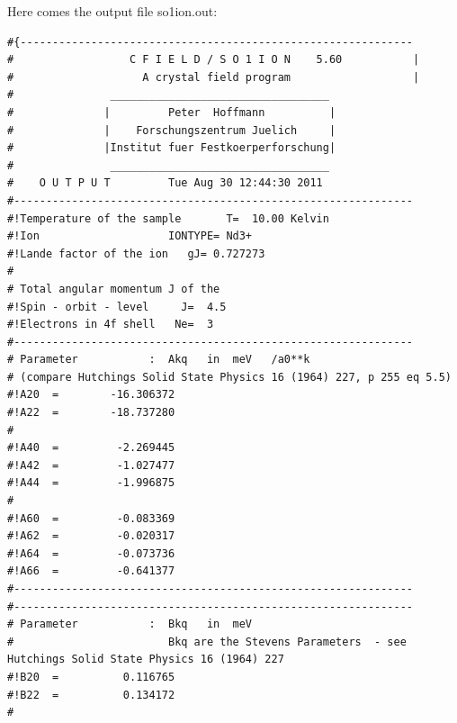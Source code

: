 \begin{enumerate}
Here comes the output file {\prg so1ion.out}:
{\footnotesize
\begin{verbatim}
#{------------------------------------------------------------- 
#                  C F I E L D / S O 1 I O N    5.60           |
#                    A crystal field program                   |
#               __________________________________              
#              |         Peter  Hoffmann          |             
#              |    Forschungszentrum Juelich     |             
#              |Institut fuer Festkoerperforschung|             
#               __________________________________              
#    O U T P U T         Tue Aug 30 12:44:30 2011
#-------------------------------------------------------------- 
#!Temperature of the sample       T=  10.00 Kelvin                
#!Ion                    IONTYPE= Nd3+                          
#!Lande factor of the ion   gJ= 0.727273                       
#                                                              
# Total angular momentum J of the                               
#!Spin - orbit - level     J=  4.5                            
#!Electrons in 4f shell   Ne=  3                              
#-------------------------------------------------------------- 
# Parameter           :  Akq   in  meV   /a0**k                  
# (compare Hutchings Solid State Physics 16 (1964) 227, p 255 eq 5.5)                             
#!A20  =        -16.306372                                     
#!A22  =        -18.737280                                     
#                                                              
#!A40  =         -2.269445                                     
#!A42  =         -1.027477                                     
#!A44  =         -1.996875                                     
#                                                              
#!A60  =         -0.083369                                     
#!A62  =         -0.020317                                     
#!A64  =         -0.073736                                     
#!A66  =         -0.641377                                     
#-------------------------------------------------------------- 
#-------------------------------------------------------------- 
# Parameter           :  Bkq   in  meV                           
#                        Bkq are the Stevens Parameters  - see Hutchings Solid State Physics 16 (1964) 227
#!B20  =          0.116765                                     
#!B22  =          0.134172                                     
#                                                              

\end{verbatim}}
\end{enumerate}
